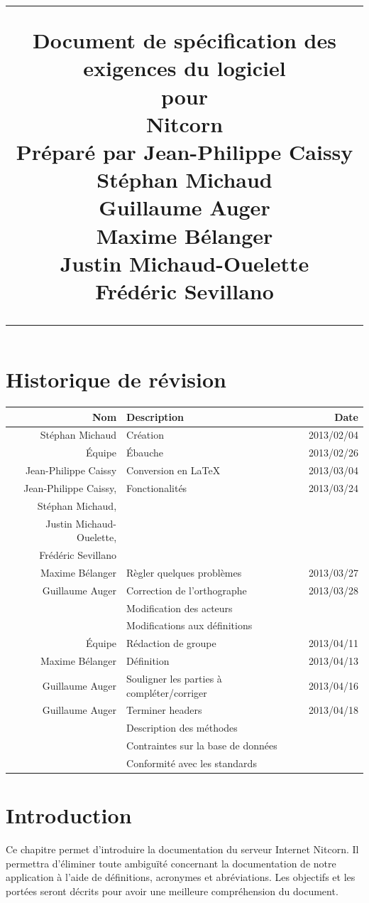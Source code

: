 \documentclass{scrreprt}
\title{
\flushright
\rule{16cm}{5pt}\vskip1cm
\Huge{Document de spécification des exigences du logiciel}\\
\vspace{2cm}
pour\\
\vspace{2cm}
Nitcorn\\
\vspace{2cm}
Préparé par Jean-Philippe Caissy\\Stéphan Michaud\\Guillaume Auger\\Maxime
Bélanger\\Justin Michaud-Ouelette\\Frédéric Sevillano\\
\vfill
\rule{16cm}{5pt}
}
\date{}
\begin{document}
\maketitle
\tableofcontents
\chapter*{Historique de révision}
\begin{tabularx}{\textwidth}{|r|X|r|}
    \hline
    Nom & Description & Date \\
    \hline
    Stéphan Michaud & Création & 2013/02/04 \\
    \hline
    Équipe & Ébauche & 2013/02/26 \\
    \hline
    Jean-Philippe Caissy & Conversion en \LaTeX & 2013/03/04 \\
    \hline
    Jean-Philippe Caissy,& Fonctionalités & 2013/03/24\\
    Stéphan Michaud,& &\\
    Justin Michaud-Ouelette, & &\\
    Frédéric Sevillano & & \\
    \hline
    Maxime Bélanger & Règler quelques problèmes & 2013/03/27  \\
    \hline
    Guillaume Auger & Correction de l'orthographe & 2013/03/28  \\
     & Modification des acteurs &\\
     & Modifications aux définitions &\\
    \hline
    Équipe & Rédaction de groupe & 2013/04/11 \\
    \hline
    Maxime Bélanger & Définition & 2013/04/13 \\
    \hline
    Guillaume Auger & Souligner les parties à compléter/corriger & 2013/04/16 \\
    \hline
    Guillaume Auger & Terminer headers & 2013/04/18 \\
    & Description des méthodes & \\
    & Contraintes sur la base de données & \\
    & Conformité avec les standards & \\
    \hline
\end{tabularx}

\chapter{Introduction}
Ce chapitre permet d'introduire la documentation du serveur Internet Nitcorn. Il permettra d'éliminer toute ambiguïté concernant la documentation
de notre application à l'aide de définitions, acronymes et
abréviations. Les objectifs et les portées seront décrits pour
avoir une meilleure compréhension du document.
\end{document}
